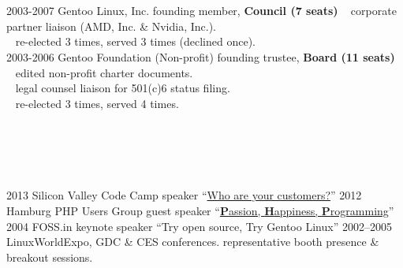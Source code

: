 \documentclass[]{friggeri-cv} %
\begin{document}
\section{{} {} {\normalsize {}~~}}
\begin{entrylist}
\entry
{2003-2007}
{Gentoo Linux, Inc.}
{founding member, {\textbf{\color{DarkGray}Council (7 seats)}}}
{{\tiny {}} ~ corporate partner liaison (AMD, Inc. \& Nvidia, Inc.).\\
{\tiny {}} ~ re-elected 3 times, served 3 times (declined once).\\}
\entry
{2003-2006}
{Gentoo Foundation (Non-profit)}
{founding trustee, {\textbf{\color{DarkGray}Board (11 seats)}}}
{{\tiny {}} ~ edited non-profit charter documents.\\
{\tiny {}} ~ legal counsel liaison for 501(c)6 status filing.\\
{\tiny {}} ~ re-elected 3 times, served 4 times.}
\end{entrylist}
\section{{} {} {\normalsize {}~~}}

\begin{entrylist}
\entry
{2013}
{Silicon Valley Code Camp}
{speaker}
{``\href{http://www.siliconvalley-codecamp.com/Session/2013/who-are-your-customers}{Who are your customers?}''}
\entry
{2012}
{Hamburg PHP Users Group}
{guest speaker}
{``\href{https://speakerdeck.com/seemantk/developing-with-passion}{\textbf{P}assion, \textbf{H}appiness, \textbf{P}rogramming}''}
\entry
{2004}
{FOSS.in}
{keynote speaker}
{``Try open source, Try Gentoo Linux''}
\entry
{2002--2005}
{LinuxWorldExpo, GDC \& CES conferences.}
{representative}
{booth presence \& breakout sessions.}
\end{entrylist}
\end{document}
